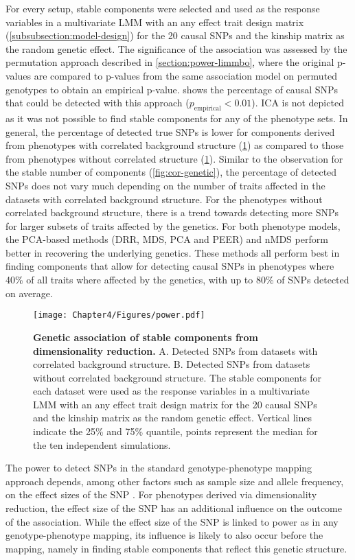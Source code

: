 For every setup, stable components were selected and used as the response variables in a multivariate LMM with an any effect trait design matrix (\cref{subsubsection:model-design}) for the \num{20} causal SNPs and the kinship matrix as the random genetic effect. The significance of the association was assessed by the permutation approach described in \cref{section:power-limmbo}, where the original p-values are compared to p-values from the same association model on permuted genotypes to obtain an empirical p-value.  shows the percentage of causal SNPs that could be detected with this approach (\(p_\text{empirical} < 0.01\)). ICA is not depicted as it was not possible to find stable components for any of the phenotype sets.  In general, the percentage of detected true SNPs is lower for components derived from phenotypes with correlated background structure (\cref{fig:power-dimRed}) as compared to those from phenotypes without correlated structure (\cref{fig:power-dimRed}). Similar to the observation for the stable number of components (\cref{fig:cor-genetic}), the percentage of detected SNPs does not vary much depending on the number of traits affected in the datasets with correlated background structure. For the phenotypes without correlated background structure, there is a trend towards detecting more SNPs for larger subsets of traits affected by the genetics. For both phenotype models, the PCA-based methods (DRR, MDS, PCA and PEER) and nMDS perform better in recovering the underlying genetics. These methods all perform best in finding components that allow for detecting causal SNPs in phenotypes where \num{40}\% of all traits where affected by the genetics, with up to \num{80}\% of SNPs detected on average. 
%
\begin{figure}[hbtp]
	\centering
	\texttt{[image: Chapter4/Figures/power.pdf]}
	\caption[\textbf{Genetic association of stable components from dimensionality reduction.}]{\textbf{Genetic association of stable components from dimensionality reduction. } A. Detected SNPs from datasets with correlated background structure. B.  Detected SNPs from datasets without correlated background structure. The stable components for each dataset were used as the response variables in a multivariate LMM with an any effect trait design matrix for the \num{20} causal SNPs and the kinship matrix as the random genetic effect. Vertical lines indicate the \num{25}\% and \num{75}\% quantile, points represent the median for the ten independent simulations. } 
	 	\label{fig:power-dimRed}
\end{figure}
%
The power to detect SNPs in the standard genotype-phenotype mapping approach depends, among other factors such as sample size and allele frequency, on the effect sizes of the SNP \citep{Cohen1992,Halsey2015,Astle2016}.  For phenotypes derived via dimensionality reduction, the effect size of the SNP has an additional influence on the outcome of the association.  While the effect size of the SNP is linked to power as in any genotype-phenotype mapping, its influence is likely to also occur before the mapping, namely in finding stable components that reflect this genetic structure. 

